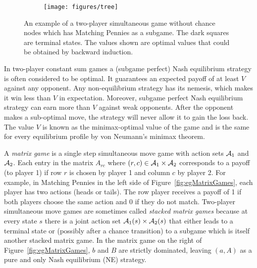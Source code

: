 \begin{figure}[t!]
\centering
\begin{subfigure}{12cm}
\centering
\texttt{[image: figures/tree]}\\
\end{subfigure}%
\caption{An example of a two-player simultaneous game without chance nodes which has Matching Pennies as a subgame. %
The dark squares are terminal states. The values shown are optimal values that could be obtained by backward induction.\\
\label{fig:example}}
\end{figure}
In two-player constant sum games a (subgame perfect) Nash equilibrium strategy is often considered to be optimal. It guarantees an expected payoff of at least $V$ against any opponent. Any non-equilibrium strategy has its nemesis, which makes it win less 
than $V$ in expectation. Moreover, subgame perfect Nash equilibrium strategy can earn more than $V$ against weak opponents. After the 
opponent makes a sub-optimal move, the strategy will never allow it to gain the loss back.
The value $V$ is known as the minimax-optimal value of the game
and is the same for every equilibrium profile by von Neumann's minimax theorem.


A {\it matrix game} is a single step simultaneous move game with action sets $\mathcal{A}_1$ and $\mathcal{A}_2$. 
Each entry in the matrix $A_{rc}$ where $(r,c) \in \mathcal{A}_1 \times \mathcal{A}_2$ corresponds to a payoff (to player 1) if row $r$ is 
chosen by player 1 and column $c$ by player 2. 
For example, in Matching Pennies in the left side of Figure~\ref{fig:egMatrixGames}, each player has two actions (heads or tails). 
The row player receives a payoff of 1 
if both players choose the same action and 0 if they do not match. 
Two-player simultaneous move games are sometimes called {\it stacked matrix games} because at every state 
$s$ there is a joint action set $\mathcal{A}_1(s) \times \mathcal{A}_2(s)$ that either leads to a terminal state or (possibly after a 
chance transition) to a subgame which is itself another stacked matrix game. 
In the matrix game on the right of Figure~\ref{fig:egMatrixGames}, $b$ and $B$ are strictly dominated, leaving $(a,A)$ as a 
pure and only Nash equilibrium (NE) strategy.

